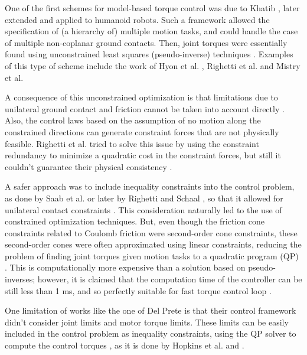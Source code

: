 	One of the first schemes for model-based torque control was due to Khatib
	\cite{Khatib_RoboticsAuto1987}, later extended and applied to humanoid robots.
	Such a framework allowed the specification of (a hierarchy of) multiple motion tasks,
	and could handle the case of multiple non-coplanar ground contacts.
	Then, joint torques were essentially found using unconstrained least squares (pseudo-inverse) techniques
	\cite{DelPrete_PhDThesis2013}.
	Examples of this type of scheme include the work of Hyon et al. \cite{Hyon_TransRobotics2007},
	Righetti et al. \cite{Righetti_CLAWAR2010} and Mistry et al. \cite{Mistry_ICRA2010}
	
	A consequence of this unconstrained optimization is that limitations due to unilateral ground contact
	and friction cannot be taken into account directly \cite{Koolen_IJHR2016}.
	Also, the control laws based on the assumption of no motion along the constrained directions can
	generate constraint forces that are not physically feasible.
	Righetti et al.	\cite{Righetti_Humanoids2011} tried to solve this issue by using the constraint
	redundancy to minimize a quadratic cost in the constraint forces, but still it couldn't guarantee
	their physical consistency \cite{DelPrete_PhDThesis2013}.
	
	A safer approach was to include inequality constraints into the control problem, as done by Saab et al.
	\cite{Saab_ICRA2011} \cite{Saab_IROS2011} or later by Righetti and Schaal	\cite{Righetti_Humanoids2012},
	so that it allowed for unilateral contact constraints \cite{DelPrete_PhDThesis2013}.
	This consideration naturally led to the use of constrained optimization	techniques.
	But, even though the friction cone constraints related to Coulomb friction were second-order cone
	constraints, these second-order cones were often approximated using linear constraints, reducing the
	problem of finding joint torques given motion tasks to a quadratic program (QP) \cite{Koolen_IJHR2016}.
	This is computationally more expensive than a solution based on pseudo-inverses; however, it is
	claimed that the computation time of the controller can be still less than 1 ms, and so perfectly
	suitable for fast torque control loop \cite{DelPrete_PhDThesis2013}.
	
	One limitation of works like the one of Del Prete \cite{DelPrete_PhDThesis2013} is that their control
	framework didn't consider joint limits and motor torque limits.
	These limits can be easily included in the control problem as inequality constraints, using the QP
	solver to compute the control torques \cite{DelPrete_PhDThesis2013}, as it is done by Hopkins et al.
	\cite{Hopkins_IJHR2016} and \cite{Koolen_IJHR2016}.